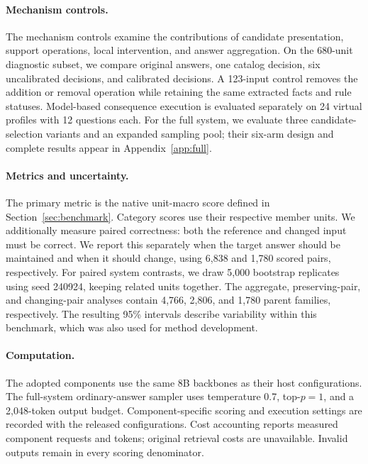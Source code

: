 \paragraph{Mechanism controls.}
The mechanism controls examine the contributions of candidate presentation, support operations, local intervention, and answer aggregation. On the 680-unit diagnostic subset, we compare original answers, one catalog decision, six uncalibrated decisions, and calibrated decisions. A 123-input control removes the addition or removal operation while retaining the same extracted facts and rule statuses. Model-based consequence execution is evaluated separately on 24 virtual profiles with 12 questions each. For the full system, we evaluate three candidate-selection variants and an expanded sampling pool; their six-arm design and complete results appear in Appendix~\ref{app:full}.

\paragraph{Metrics and uncertainty.}
The primary metric is the native unit-macro score defined in Section~\ref{sec:benchmark}. Category scores use their respective member units. We additionally measure paired correctness: both the reference and changed input must be correct. We report this separately when the target answer should be maintained and when it should change, using 6,838 and 1,780 scored pairs, respectively. For paired system contrasts, we draw 5,000 bootstrap replicates using seed 240924, keeping related units together. The aggregate, preserving-pair, and changing-pair analyses contain 4,766, 2,806, and 1,780 parent families, respectively. The resulting 95\% intervals describe variability within this benchmark, which was also used for method development.

\paragraph{Computation.}
The adopted components use the same 8B backbones as their host configurations. The full-system ordinary-answer sampler uses temperature 0.7, top-$p=1$, and a 2,048-token output budget. Component-specific scoring and execution settings are recorded with the released configurations. Cost accounting reports measured component requests and tokens; original retrieval costs are unavailable. Invalid outputs remain in every scoring denominator.
